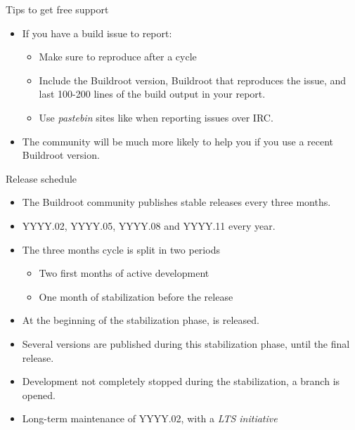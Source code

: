 \begin{frame}{Tips to get free support}
  \begin{itemize}
  \item If you have a build issue to report:
    \begin{itemize}
    \item Make sure to reproduce after a  cycle
    \item Include the Buildroot version, Buildroot  that
      reproduces the issue, and last 100-200 lines of the build
      output in your report.
    \item Use {\em pastebin} sites like 
      when reporting issues over IRC.
    \end{itemize}
  \item The community will be much more likely to help you if you use
    a recent Buildroot version.
  \end{itemize}
\end{frame}

\begin{frame}{Release schedule}
  \begin{itemize}
  \item The Buildroot community publishes stable releases every three
    months.
  \item YYYY.02, YYYY.05, YYYY.08 and YYYY.11 every year.
  \item The three months cycle is split in two periods
    \begin{itemize}
    \item Two first months of active development
    \item One month of stabilization before the release
    \end{itemize}
  \item At the beginning of the stabilization phase,  is
    released.
  \item Several  versions are published during this
    stabilization phase, until the final release.
  \item Development not completely stopped during the stabilization, a
     branch is opened.
  \item Long-term maintenance of YYYY.02, with a {\em LTS initiative}
  \end{itemize}
\end{frame}

